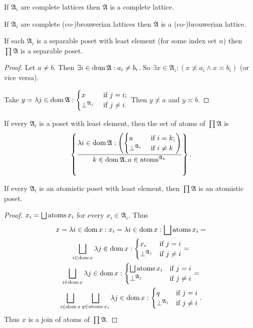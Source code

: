 \begin{cor}
If $\mathfrak{A}_{i}$ are complete lattices then $\mathfrak{A}$
is a complete lattice.\end{cor}
\begin{obvious}
If $\mathfrak{A}_{i}$ are complete (co-)brouwerian lattices then
$\mathfrak{A}$ is a (co-)brouwerian lattice.\end{obvious}
\begin{prop}
If each $\mathfrak{A}_{i}$ is a separable poset with least element
(for some index set $n$) then $\prod\mathfrak{A}$ is a separable
poset.\end{prop}
\begin{proof}
Let $a\neq b$. Then $\exists i\in\operatorname{dom}\mathfrak{A}:a_{i}\neq b_{i}$.
So $\exists x\in\mathfrak{A}_{i}:(x\nasymp a_{i}\wedge x\asymp b_{i})$
(or vice versa).

Take $y=\lambda j\in\operatorname{dom}\mathfrak{A}:\begin{cases}x&\text{ if }j=i;\\\bot^{\mathfrak{A}_j}&\text{ if }j\ne i.\end{cases}$
Then $y\nasymp a$ and $y\asymp b$.\end{proof}
\begin{obvious}
If every $\mathfrak{A}_{i}$ is a poset with least element,
then the set of atoms of $\prod\mathfrak{A}$ is
\[
\left\{ \frac{\lambda i\in\operatorname{dom}\mathfrak{A}:\left(\begin{cases}a&\text{ if }i=k;\\\bot^{\mathfrak{A}_i}&\text{ if }i\ne k\end{cases}\right)}{k\in\operatorname{dom}\mathfrak{A}, a\in\operatorname{atoms}^{\mathfrak{A}_{k}}}\right\}.
\]
\end{obvious}
\begin{prop}
If every $\mathfrak{A}_{i}$ is an atomistic poset with least element, then $\prod\mathfrak{A}$ is an atomistic poset.\end{prop}
\begin{proof}
$x_{i}=\bigsqcup\operatorname{atoms} x_{i}$ for every $x_{i}\in\mathfrak{A}_{i}$.
Thus
\begin{multline*}
x=\lambda i\in\operatorname{dom} x:x_{i}=
\lambda i\in\operatorname{dom} x:\bigsqcup\operatorname{atoms} x_{i}=\\
\bigsqcup_{i\in\operatorname{dom} x}\lambda j\in\operatorname{dom} x:\begin{cases}
x_{i} & \text{if }j=i\\
\bot^{\mathfrak{A}_j} & \text{if }j\ne i
\end{cases} = \\
\bigsqcup_{i\in\operatorname{dom} x}\lambda j\in\operatorname{dom} x:\begin{cases}
\bigsqcup\operatorname{atoms} x_{i} & \text{if }j=i\\
\bot^{\mathfrak{A}_j} & \text{if }j\ne i
\end{cases} =\\
\bigsqcup_{i\in\operatorname{dom} x}\bigsqcup_{q\in\operatorname{atoms} x_i}\lambda j\in\operatorname{dom} x:\begin{cases}
q & \text{if }j=i\\
\bot^{\mathfrak{A}_j} & \text{if }j\ne i
\end{cases}.
\end{multline*}
Thus $x$ is a join of atoms of $\prod\mathfrak{A}$.\end{proof}

